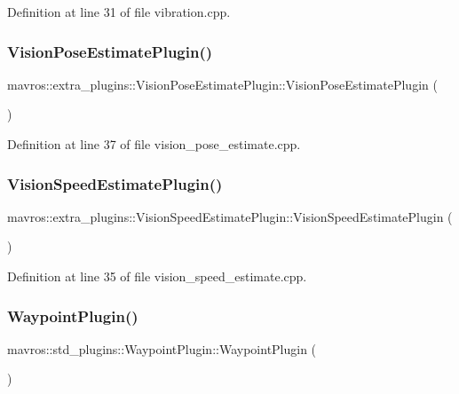 Definition at line 31 of file vibration.\+cpp.

\mbox{\label{group__plugin_ga5a78aaf3ee493b641c7ae03f3f625f37}} 
\subsubsection{\texorpdfstring{VisionPoseEstimatePlugin()}{VisionPoseEstimatePlugin()}}
{\footnotesize\ttfamily mavros\+::extra\+\_\+plugins\+::\+Vision\+Pose\+Estimate\+Plugin\+::\+Vision\+Pose\+Estimate\+Plugin (\begin{DoxyParamCaption}{ }\end{DoxyParamCaption})\hspace{0.3cm}{\ttfamily [inline]}}



Definition at line 37 of file vision\+\_\+pose\+\_\+estimate.\+cpp.

\mbox{\label{group__plugin_ga07495c5fc78a5b2e75f92d062c2ed7b1}} 
\subsubsection{\texorpdfstring{VisionSpeedEstimatePlugin()}{VisionSpeedEstimatePlugin()}}
{\footnotesize\ttfamily mavros\+::extra\+\_\+plugins\+::\+Vision\+Speed\+Estimate\+Plugin\+::\+Vision\+Speed\+Estimate\+Plugin (\begin{DoxyParamCaption}{ }\end{DoxyParamCaption})\hspace{0.3cm}{\ttfamily [inline]}}



Definition at line 35 of file vision\+\_\+speed\+\_\+estimate.\+cpp.

\mbox{\label{group__plugin_ga6aff35d26d32a5d88603dd85119c1056}} 
\subsubsection{\texorpdfstring{WaypointPlugin()}{WaypointPlugin()}}
{\footnotesize\ttfamily mavros\+::std\+\_\+plugins\+::\+Waypoint\+Plugin\+::\+Waypoint\+Plugin (\begin{DoxyParamCaption}{ }\end{DoxyParamCaption})\hspace{0.3cm}{\ttfamily [inline]}}



